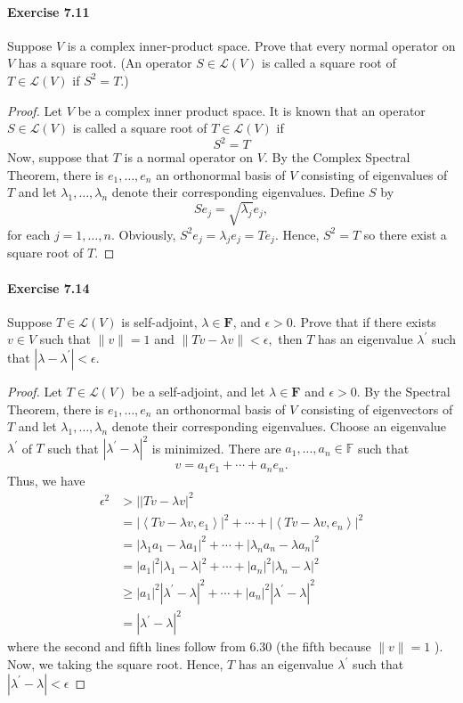 \documentclass{article}
\theoremstyle{definition}
\begin{document}
\paragraph{Exercise 7.11} Suppose $V$ is a complex inner-product space. Prove that every normal operator on $V$ has a square root. (An operator $S \in \mathcal{L}(V)$ is called a square root of $T \in \mathcal{L}(V)$ if $S^{2}=T$.)
\begin{proof}
    Let $V$ be a complex inner product space.
It is known that an operator $S \in \mathcal{L}(V)$ is called a square root of $T \in \mathcal{L}(V)$ if
$$
S^2=T
$$
Now, suppose that $T$ is a normal operator on $V$.
By the Complex Spectral Theorem, there is $e_1, \ldots, e_n$ an orthonormal basis of $V$ consisting of eigenvalues of $T$ and let $\lambda_1, \ldots, \lambda_n$ denote their corresponding eigenvalues.
Define $S$ by
$$
S e_j=\sqrt{\lambda_j} e_j,
$$
for each $j=1, \ldots, n$.
Obviously, $S^2 e_j=\lambda_j e_j=T e_j$.
Hence, $S^2=T$ so there exist a square root of $T$.
\end{proof}



\paragraph{Exercise 7.14} Suppose $T \in \mathcal{L}(V)$ is self-adjoint, $\lambda \in \mathbf{F}$, and $\epsilon>0$. Prove that if there exists $v \in V$ such that $\|v\|=1$ and $\|T v-\lambda v\|<\epsilon,$ then $T$ has an eigenvalue $\lambda^{\prime}$ such that $\left|\lambda-\lambda^{\prime}\right|<\epsilon$.
\begin{proof}
    Let $T \in \mathcal{L}(V)$ be a self-adjoint, and let $\lambda \in \mathbf{F}$ and $\epsilon>0$.
By the Spectral Theorem, there is $e_1, \ldots, e_n$ an orthonormal basis of $V$ consisting of eigenvectors of $T$ and let $\lambda_1, \ldots, \lambda_n$ denote their corresponding eigenvalues.
Choose an eigenvalue $\lambda^{\prime}$ of $T$ such that $\left|\lambda^{\prime}-\lambda\right|^2$ is minimized.
There are $a_1, \ldots, a_n \in \mathbb{F}$ such that
$$
v=a_1 e_1+\cdots+a_n e_n .
$$
Thus, we have
$$
\begin{aligned}
\epsilon^2 & >|| T v-\left.\lambda v\right|^2 \\
& =\left|\left\langle T v-\lambda v, e_1\right\rangle\right|^2+\cdots+\left|\left\langle T v-\lambda v, e_n\right\rangle\right|^2 \\
& =\left|\lambda_1 a_1-\lambda a_1\right|^2+\cdots+\left|\lambda_n a_n-\lambda a_n\right|^2 \\
& =\left|a_1\right|^2\left|\lambda_1-\lambda\right|^2+\cdots+\left|a_n\right|^2\left|\lambda_n-\lambda\right|^2 \\
& \geq\left|a_1\right|^2\left|\lambda^{\prime}-\lambda\right|^2+\cdots+\left|a_n\right|^2\left|\lambda^{\prime}-\lambda\right|^2 \\
& =\left|\lambda^{\prime}-\lambda\right|^2
\end{aligned}
$$
where the second and fifth lines follow from $6.30$ (the fifth because $\|v\|=1$ ). Now, we taking the square root.
Hence, $T$ has an eigenvalue $\lambda^{\prime}$ such that $\left|\lambda^{\prime}-\lambda\right|<\epsilon$
\end{proof}
\end{document}
